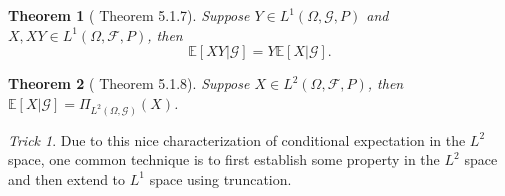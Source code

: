 \documentclass[openany]{book}
\newtheorem{theorem}{Theorem}[chapter]
\theoremstyle{definition}
\theoremstyle{remark}
\newtheorem*{trick}{Trick}
\begin{document}
\begin{theorem}[\cite{D10} Theorem 5.1.7]
    Suppose $Y\in L^1(\Omega,\mathcal{G},P)$ and $X,XY\in L^1(\Omega,\mathcal{F},P)$, then
    \begin{equation*}
        \mathbb{E}[XY|\mathcal{G}]=Y \mathbb{E}[X|\mathcal{G}].
    \end{equation*}
\end{theorem}
\begin{theorem}[\cite{D10} Theorem 5.1.8]
    Suppose $X\in L^2(\Omega,\mathcal{F},P)$, then $\mathbb{E}[X|\mathcal{G}]=\Pi_{L^2(\Omega,\mathcal{G})}(X)$.
\end{theorem}
\begin{trick}
    Due to this nice characterization of conditional expectation in the $L^2$ space, one common technique is to first establish some property in the $L^2$ space and then extend to $L^1$ space using truncation.
\end{trick}
\end{document}
